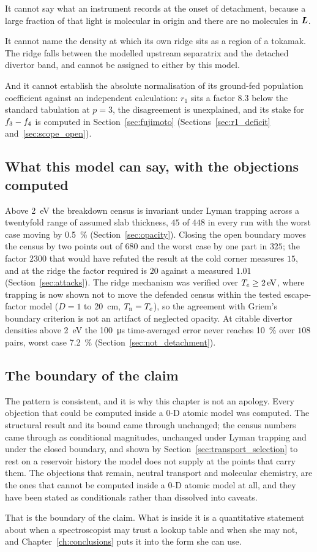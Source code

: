 It cannot say what an instrument records at the onset of detachment, because a
large fraction of that light is molecular in origin and there are no molecules
in $\bm{L}$.

It cannot name the density at which its own ridge sits as a region of a tokamak.
The ridge falls between the modelled upstream separatrix and the detached
divertor band, and cannot be assigned to either by this model.

And it cannot establish the absolute normalisation of its ground-fed
population coefficient against an independent calculation: $r_1$ sits a factor
$8.3$ below the standard tabulation at $p = 3$, the disagreement is
unexplained, and its stake for $f_{3}-f_{4}$ is computed in
Section~\ref{sec:fujimoto} (Sections~\ref{sec:r1_deficit}
and~\ref{sec:scope_open}).

\subsection{What this model can say, with the objections computed}

Above \SI{2}{\electronvolt} the breakdown census is invariant under Lyman
trapping across a twentyfold range of assumed slab thickness, $45$ of $448$ in
every run with the worst case moving by \SI{0.5}{\percent}
(Section~\ref{sec:opacity}). Closing the open boundary moves the census by two
points out of $680$ and the worst case by one part in $325$; the factor $2300$
that would have refuted the result at the cold corner measures $15$, and at the
ridge the factor required is $20$ against a measured $1.01$
(Section~\ref{sec:attacks}). The ridge mechanism was verified over
$T_e \ge \SI{2}{\electronvolt}$, where trapping is now shown not to move the
defended census within the tested escape-factor model ($D = 1$ to
\SI{20}{\centi\metre}, $T_{\mathrm{n}} = T_e$), so the agreement with Griem's boundary
criterion is not an artifact of neglected opacity. At citable divertor densities above \SI{2}{\electronvolt} the
\SI{100}{\micro\second} time-averaged error never reaches \SI{10}{\percent} over
$108$ pairs, worst case \SI{7.2}{\percent} (Section~\ref{sec:not_detachment}).

\subsection{The boundary of the claim}

The pattern is consistent, and it is why this chapter is not an apology. Every
objection that could be computed inside a $0$-D atomic model was computed. The
structural result and its bound came through unchanged; the census numbers came
through as conditional magnitudes, unchanged under Lyman trapping and under the
closed boundary, and shown by Section~\ref{sec:transport_selection} to rest on a
reservoir history the model does not supply at the points that carry them. The
objections that remain, neutral transport and molecular chemistry, are the
ones that cannot be computed inside a $0$-D atomic model at all, and they have
been stated as conditionals rather than dissolved into caveats.

That is the boundary of the claim. What is inside it is a quantitative statement
about when a spectroscopist may trust a lookup table and when she may not, and
Chapter~\ref{ch:conclusions} puts it into the form she can use.
